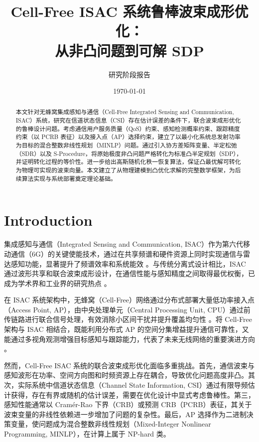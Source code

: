\documentclass[12pt,a4paper]{article}
\title{\textbf{Cell-Free ISAC 系统鲁棒波束成形优化：\\从非凸问题到可解 SDP}}
\author{研究阶段报告}
\date{\today}
\begin{document}
\maketitle

\begin{abstract}
本文针对无蜂窝集成感知与通信（Cell-Free Integrated Sensing and Communication, ISAC）系统，研究在信道状态信息（CSI）存在估计误差的条件下，联合波束成形优化的鲁棒设计问题。考虑通信用户服务质量（QoS）约束、感知检测概率约束、跟踪精度约束（以 PCRB 表征）以及接入点（AP）选择约束，建立了以最小化系统总发射功率为目标的混合整数非线性规划（MINLP）问题。通过引入协方差矩阵变量、半定松弛（SDR）以及 S-Procedure，将原始极度非凸问题严格转化为标准凸半定规划（SDP），并证明转化过程的等价性。进一步给出高斯随机化秩一恢复算法，保证凸最优解可转化为物理可实现的波束向量。本文建立了从物理建模到凸优化求解的完整数学框架，为后续算法实现与系统部署奠定理论基础。
\end{abstract}

\tableofcontents
\newpage

\section{Introduction}

集成感知与通信（Integrated Sensing and Communication, ISAC）作为第六代移动通信（6G）的关键使能技术，通过在共享频谱和硬件资源上同时实现通信与雷达感知功能，显著提升了频谱效率和系统能效 \cite{liu2022integrated}。与传统分离式设计相比，ISAC 通过波形共享和联合波束成形设计，在通信性能与感知精度之间取得最优权衡，已成为学术界和工业界的研究热点 \cite{zhang2021overview}。

在 ISAC 系统架构中，无蜂窝（Cell-Free）网络通过分布式部署大量低功率接入点（Access Point, AP），由中央处理单元（Central Processing Unit, CPU）通过前传链路进行联合信号处理，有效消除小区间干扰并提升覆盖均匀性 \cite{ngo2017cell}。将 Cell-Free 架构与 ISAC 相结合，既能利用分布式 AP 的空间分集增益提升通信可靠性，又能通过多视角观测增强目标感知与跟踪能力，代表了未来无线网络的重要演进方向 \cite{demirhan2022cell}。

然而，Cell-Free ISAC 系统的联合波束成形优化面临多重挑战。首先，通信波束与感知波形在功率、空间方向图和时频资源上存在耦合，导致优化问题高度非凸。其次，实际系统中信道状态信息（Channel State Information, CSI）通过有限导频估计获得，存在有界或随机的估计误差，需要在优化设计中显式考虑鲁棒性。第三，感知性能通常以 Cram\'{e}r-Rao 下界（CRB）或预测 CRB（PCRB）表征，其关于波束变量的非线性依赖进一步增加了问题的复杂性。最后，AP 选择作为二进制决策变量，使问题成为混合整数非线性规划（Mixed-Integer Nonlinear Programming, MINLP），在计算上属于 NP-hard 类。
\end{document}
